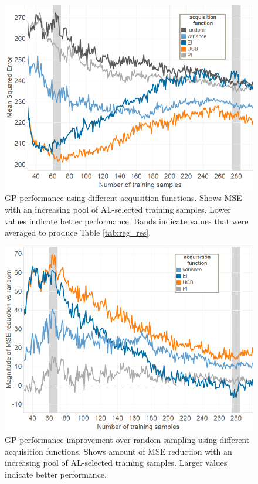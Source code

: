 \documentclass{sig-alternate}
\begin{document}
\begin{figure}[tb]
\centering
\includegraphics[width=\linewidth]{regression_experiment_happy}
\caption{GP performance using different acquisition functions.
Shows MSE with an increasing pool of AL-selected training samples.
Lower values indicate better performance.
Bands indicate values that were averaged to produce Table \ref{tab:reg_res}.
}
\label{fig:reg_happy}
\end{figure}

\begin{figure}[tb]
\centering
\includegraphics[width=\linewidth]{regression_experiment}
\caption{GP performance improvement over random sampling using different acquisition functions.
Shows amount of MSE reduction with an increasing pool of AL-selected training samples.
Larger values indicate better performance.
}
\label{fig:reg_all}
\end{figure}
\end{document}
